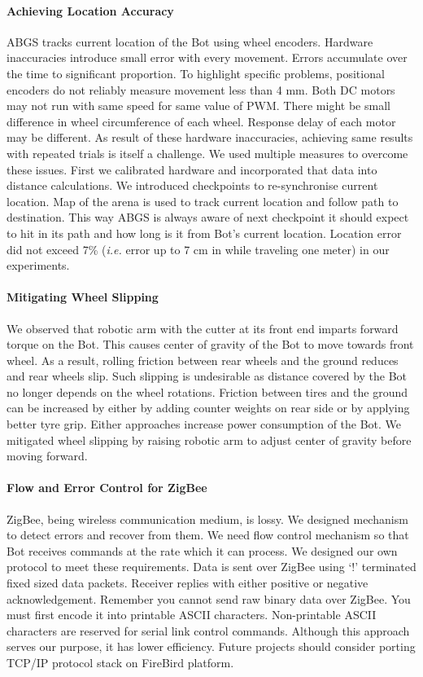 \documentclass[a4paper, 12pt]{article}
\begin{document}
 \paragraph{Achieving Location Accuracy}
 ABGS tracks current location of the Bot using wheel encoders. Hardware inaccuracies introduce small error with
 every movement. Errors accumulate over the time to significant proportion. To highlight specific problems,
 positional encoders do not reliably measure movement less than 4 mm. Both DC motors may not run with same speed
 for same value of PWM. There might be small difference in wheel circumference of each wheel. Response delay of
 each motor may be different. As result of these hardware inaccuracies, achieving same results with repeated trials
 is itself a challenge. We used multiple measures to overcome these issues. First we calibrated hardware and
 incorporated that data into distance calculations. We introduced checkpoints to re-synchronise current location.
 Map of the arena is used to track current location and follow path to destination. This way ABGS is always aware
 of next checkpoint it should expect to hit in its path and how long is it from Bot's current location. 
 Location error did not exceed 7\% (\emph{i.e.} error up to 7 cm in while traveling one meter) in our experiments.
 
 \paragraph{Mitigating Wheel Slipping}
 We observed that robotic arm with the cutter at its front end imparts forward torque on the Bot. This causes center of
 gravity of the Bot to move towards front wheel. As a result, rolling friction between rear wheels and the ground
 reduces and rear wheels slip. Such slipping is undesirable as distance covered by the Bot no longer depends on
 the wheel rotations. Friction between tires and the ground can be increased by either by adding counter weights on rear
 side or by applying better tyre grip. Either approaches increase power consumption of the Bot. We mitigated wheel
 slipping by raising robotic arm to adjust center of gravity before moving forward.
 
 \paragraph{Flow and Error Control for ZigBee}
 ZigBee, being wireless communication medium, is lossy. We designed mechanism to detect errors and recover from them.
 We need flow control mechanism so that Bot receives commands at the rate which it can process. We designed our
 own protocol to meet these requirements. Data is sent over ZigBee using `$!$' terminated fixed sized data packets.
 Receiver replies with either positive or negative acknowledgement. Remember you cannot send raw binary data over
 ZigBee. You must first encode it into printable ASCII characters. Non-printable ASCII characters are reserved
 for serial link control commands. Although this approach serves our purpose, it has lower efficiency. Future
 projects should consider porting TCP/IP protocol stack on FireBird platform.
 
\end{document}
